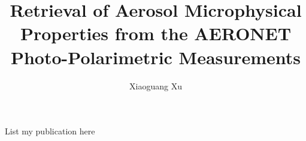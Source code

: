 \documentclass[phd, print]{nuthesis}
\begin{document}
\frontmatter

\title{Retrieval of Aerosol Microphysical Properties from the AERONET
Photo-Polarimetric Measurements}
\author{Xiaoguang Xu}
\maketitle

%


\tableofcontents*
\begingroup
\onehalfspacing
\allowdisplaybreaks
\listoffigures
\listoftables
\endgroup

\mainmatter


 
 
 
 
 


\backmatter

\appendix





\begin{onehalfspacing}


\end{onehalfspacing}

\newpage
\begin{listofpub}
  List my publication here
\end{listofpub}

\end{document}
